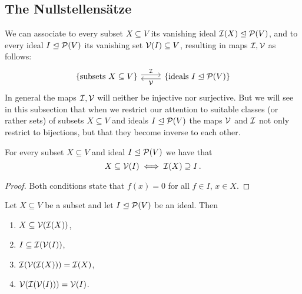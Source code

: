 \subsection{The Nullstellensätze}


\begin{fluff}
  We can associate to every subset $X \subseteq V$ its vanishing ideal $\mathcal{I}(X) \trianglelefteq \mathcal{P}(V)$, and to every ideal $I \trianglelefteq \mathcal{P}(V)$ its vanishing set $\mathcal{V}(I) \subseteq V$, resulting in maps $\mathcal{I}, \mathcal{V}$ as follows:
  \[
    \begin{tikzcd}
        \{ \text{subsets $X \subseteq V$} \}
        \arrow[shift left]{r}[above]{\mc{I}}
      & \{ \text{ideals $I \idealeq \mc{P}(V)$} \}
        \arrow[shift left]{l}[below]{\mc{V}}
    \end{tikzcd}
  \]
  In general the maps $\mathcal{I}, \mathcal{V}$ will neither be injective nor surjective.
  But we will see in this subsection that when we restrict our attention to suitable classes (or rather sets) of subsets $X \subseteq V$ and ideals $I \trianglelefteq \mathcal{P}(V)$ the maps $\mathcal{V}$ and $\mathcal{I}$ not only restrict to bijections, but that they become inverse to each other.
\end{fluff}


\begin{lemma}
  \label{lemma: galois connection for vanishing ideals and zero sets}
  For every subset $X \subseteq V$ and ideal $I \trianglelefteq \mathcal{P}(V)$ we have that
  \[
          X \subseteq \mathcal{V}(I)
    \iff  \mathcal{I}(X) \supseteq I \,.
  \]
\end{lemma}


\begin{proof}
  Both conditions state that $f(x) = 0$ for all $f \in I$, $x \in X$.
\end{proof}


\begin{lemma}
  \label{lemma: properties of V and I}
  Let $X \subseteq V$ be a subset and let $I \trianglelefteq \mathcal{P}(V)$ be an ideal.
  Then
  \begin{enumerate}
    \item
      \label{enumerate: VI is monotone}
      $X \subseteq \mathcal{V}(\mathcal{I}(X))$,
    \item
      \label{enumerate: IV is monotone}
      $I \subseteq \mathcal{I}(\mathcal{V}(I))$,
    \item
      \label{enumerate: IVI = I}
      $\mathcal{I}(\mathcal{V}(\mathcal{I}(X))) = \mathcal{I}(X)$,
    \item
      \label{enumerate: VIV = V}
      $\mathcal{V}(\mathcal{I}(\mathcal{V}(I))) = \mathcal{V}(I)$.
  \end{enumerate}
\end{lemma}


